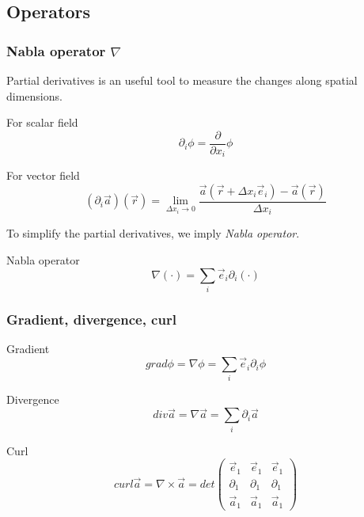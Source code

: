 \documentclass{beamer}
\begin{document}
\subsection{Operators}

\begin{frame}
    \frametitle{Nabla operator $\nabla$}
    Partial derivatives is an useful tool to measure the changes along spatial dimensions.

    For scalar field
    \begin{equation}
        \partial_{i} \phi = \frac{\partial}{\partial x_{i}} \phi
    \end{equation}

    For vector field
    \begin{equation}
        (\partial_{i} \vec{a}) (\vec{r}) = \lim_{\Delta x_{i} \rightarrow 0} \frac{\vec{a}(\vec{r} + \Delta x_{i} \vec{e}_{i}) - \vec{a}(\vec{r})}{\Delta x_{i}}
    \end{equation}

    To simplify the partial derivatives, we imply \emph{Nabla operator}.
    \begin{alertblock}{Nabla operator}
        \begin{equation}
            \nabla (\cdot) = \sum_{i} \vec{e}_{i} \partial_{i} (\cdot)
        \end{equation}
    \end{alertblock}

\end{frame}

\begin{frame}
    \frametitle{Gradient, divergence, curl}

    \begin{block}{Gradient}
        \begin{equation}
            grad \phi = \nabla \phi = \sum_{i} \vec{e}_{i} \partial_{i} \phi
        \end{equation}
    \end{block}

    \begin{block}{Divergence}
        \begin{equation}
            div \vec{a} = \nabla \vec{a} = \sum_{i} \partial_{i} \vec{a}
        \end{equation}
    \end{block}

    \begin{block}{Curl}
        \begin{equation}
            curl \vec{a} = \nabla \times \vec{a} = det
            \begin{pmatrix}
                \vec{e}_{1}  & \vec{e}_{1}  & \vec{e}_{1}  \\
                \partial_{1} & \partial_{1} & \partial_{1} \\
                \vec{a}_{1}  & \vec{a}_{1}  & \vec{a}_{1}
            \end{pmatrix}
        \end{equation}
    \end{block}

\end{frame}
\end{document}
